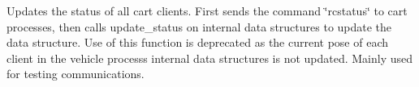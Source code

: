 
\begin{DoxyRefList}
\item[\label{deprecated__deprecated000001}%
\Hypertarget{deprecated__deprecated000001}%
Member \hyperlink{classcart__comm_ac3827fcfb77461137bf7a061471c7feb}{cart\+\_\+comm\+:\+:update\+\_\+status} ()]Updates the status of all cart clients. First sends the command \char`\"{}rcstatus\char`\"{} to cart processes, then calls update\+\_\+status on internal data structures to update the data structure. Use of this function is deprecated as the current pose of each client in the vehicle process\textquotesingle{}s internal data structures is not updated. Mainly used for testing communications. 
\end{DoxyRefList}